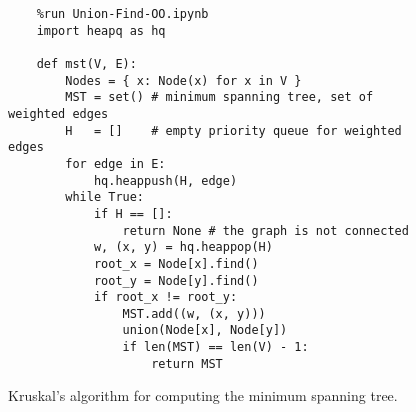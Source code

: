 \begin{figure}[!ht]
\centering
\begin{verbatim}
    %run Union-Find-OO.ipynb
    import heapq as hq     
                
    def mst(V, E):
        Nodes = { x: Node(x) for x in V }
        MST = set() # minimum spanning tree, set of weighted edges
        H   = []    # empty priority queue for weighted edges
        for edge in E:
            hq.heappush(H, edge)
        while True:
            if H == []:
                return None # the graph is not connected
            w, (x, y) = hq.heappop(H)
            root_x = Node[x].find()
            root_y = Node[y].find()
            if root_x != root_y:
                MST.add((w, (x, y)))
                union(Node[x], Node[y])
                if len(MST) == len(V) - 1:
                    return MST
\end{verbatim}
\vspace*{-0.3cm}
\caption{Kruskal's algorithm for computing the minimum spanning tree.}
\label{fig:Kruskal.ipynb}
\end{figure}

